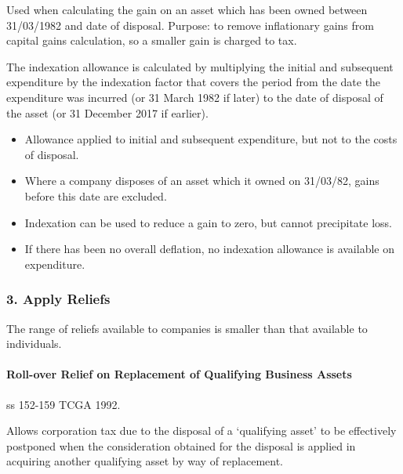 \documentclass[
]{article}
\providecommand{\tightlist}{%
  \setlength{\itemsep}{0pt}\setlength{\parskip}{0pt}}
\begin{document}
Used when calculating the gain on an asset which has been owned between
31/03/1982 and date of disposal. Purpose: to remove inflationary gains
from capital gains calculation, so a smaller gain is charged to tax.

The indexation allowance is calculated by multiplying the initial and
subsequent expenditure by the indexation factor that covers the period
from the date the expenditure was incurred (or 31 March 1982 if later)
to the date of disposal of the asset (or 31 December 2017 if earlier).

\begin{itemize}
\tightlist
\item
  Allowance applied to initial and subsequent expenditure, but not to
  the costs of disposal.
\item
  Where a company disposes of an asset which it owned on 31/03/82, gains
  before this date are excluded.
\item
  Indexation can be used to reduce a gain to zero, but cannot
  precipitate loss.
\item
  If there has been no overall deflation, no indexation allowance is
  available on expenditure.
\end{itemize}

\hypertarget{apply-reliefs}{%
\subsubsection{3. Apply Reliefs}\label{apply-reliefs}}

The range of reliefs available to companies is smaller than that
available to individuals.

\hypertarget{roll-over-relief-on-replacement-of-qualifying-business-assets}{%
\paragraph{Roll-over Relief on Replacement of Qualifying Business
Assets}\label{roll-over-relief-on-replacement-of-qualifying-business-assets}}

ss 152-159 TCGA 1992.

Allows corporation tax due to the disposal of a `qualifying asset' to be
effectively postponed when the consideration obtained for the disposal
is applied in acquiring another qualifying asset by way of replacement.
\end{document}
